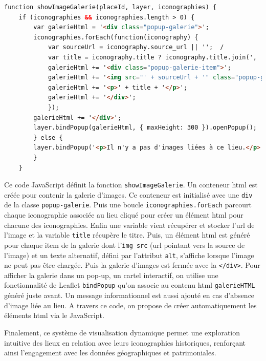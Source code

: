 \begin{lstlisting}[language=HTML, caption=Création d'un pop-up et d'une galerie d'images]
function showImageGalerie(placeId, layer, iconographies) {
    if (iconographies && iconographies.length > 0) {
        var galerieHtml = '<div class="popup-galerie">';
        iconographies.forEach(function(iconography) {
            var sourceUrl = iconography.source_url || '';  /
            var title = iconography.title ? iconography.title.join(', ') : 'Untitled';  
            galerieHtml += '<div class="popup-galerie-item">';
            galerieHtml += '<img src="' + sourceUrl + '" class="popup-galerie-image" alt="' + title + '"/>';  
            galerieHtml += '<p>' + title + '</p>';  
            galerieHtml += '</div>';
            });
        galerieHtml += '</div>';
        layer.bindPopup(galerieHtml, { maxHeight: 300 }).openPopup();
        } else {
        layer.bindPopup('<p>Il n'y a pas d'images liées à ce lieu.</p>').openPopup();
        }
    }
\end{lstlisting}
Ce code JavaScript définit la fonction \texttt{showImageGalerie}. Un conteneur \acrshort{html} est créée pour contenir la galerie d'images. Ce conteneur est initialisé avec une \texttt{div} de la classe \texttt{popup-galerie}. Puis une boucle \texttt{iconographies.forEach} parcourt chaque iconographie associée au lieu cliqué pour créer un élément \acrshort{html} pour chacune des iconographies. Enfin une variable vient récupérer et stocker l'\acrshort{url} de l'image et la variable \texttt{title} récupère le titre. Puis, un élément \acrshort{html} est généré pour chaque item de la galerie dont l'\texttt{img src} (\acrshort{url} pointant vers la source de l'image) et un texte alternatif, défini par l'attribut \texttt{alt}, s'affiche lorsque l'image ne peut pas être chargée. Puis la galerie d'images est fermée avec la \texttt{</div>}.
Pour afficher la galerie dans un pop-up, un cartel interactif, on utilise une fonctionnalité de Leaflet \texttt{bindPopup} qu'on associe au contenu \acrshort{html} \texttt{galerieHTML} généré juste avant. Un message informationnel est aussi ajouté en cas d'absence d'image liée au lieu. A travers ce code, on propose de créer automatiquement les éléments \acrshort{html} via le JavaScript. 

Finalement, ce système de visualisation dynamique permet une exploration intuitive des lieux en relation avec leurs iconographies historiques, renforçant ainsi l'engagement avec les données géographiques et patrimoniales. 

